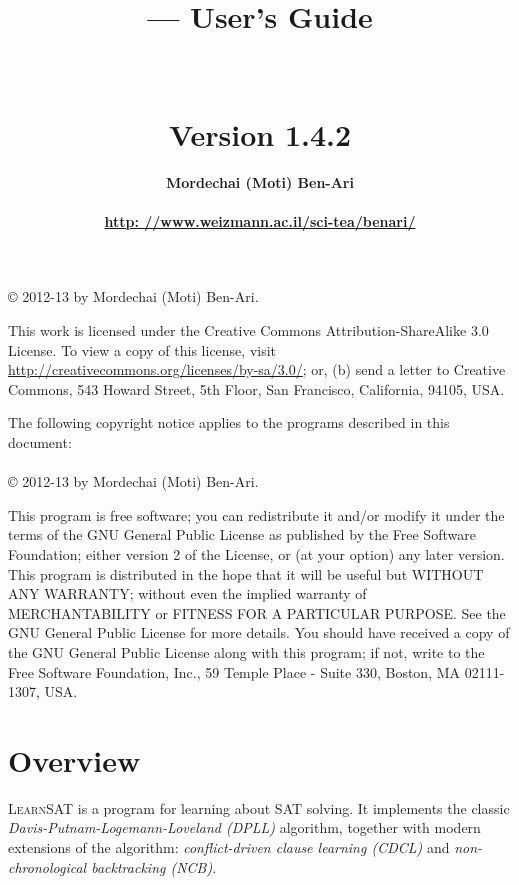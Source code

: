 \documentclass[11pt]{article}
\title{\bfseries \ls{} --- User's Guide\\\mbox{}\\\mbox{}\\
\bfseries\normalsize Version 1.4.2}
\author{\bfseries Mordechai (Moti) Ben-Ari\\\mbox{}\\
\url{http: //www.weizmann.ac.il/sci-tea/benari/}}
\newcommand*{\ls}{\textsc{LearnSAT}}
\begin{document}
\maketitle

\thispagestyle{empty}

\vspace*{\fill}

\begin{center}
\copyright{} 2012-13 by Mordechai (Moti) Ben-Ari.
\end{center}
This work is licensed under the Creative Commons Attribution-ShareAlike 3.0
License. To view a copy of this license, visit
\url{http://creativecommons.org/licenses/by-sa/3.0/}; or, (b) send a letter
to Creative Commons, 543 Howard Street, 5th Floor, San Francisco,
California, 94105, USA.

\bigskip\bigskip

 
\begin{center}
The following copyright notice applies to the programs described in this
document:\mbox{}\\\mbox{}\\
\copyright{} 2012-13 by Mordechai (Moti) Ben-Ari.
\end{center}

This program is free software; you can redistribute it and/or
modify it under the terms of the GNU General Public License
as published by the Free Software Foundation; either version 2
of the License, or (at your option) any later version.
This program is distributed in the hope that it will be useful
but WITHOUT ANY WARRANTY; without even the implied warranty of
MERCHANTABILITY or FITNESS FOR A PARTICULAR PURPOSE.
See the GNU General Public License for more details.
You should have received a copy of the GNU General Public License
along with this program; if not, write to the Free Software
Foundation, Inc., 59 Temple Place - Suite 330, Boston, MA
02111-1307, USA.

\setcounter{page}{0}
\newpage

\section{Overview}

\ls{} is a program for learning about SAT solving. It implements the
classic \emph{Davis-Putnam-Logemann-Loveland (DPLL)} algorithm, together
with modern extensions of the algorithm: \emph{conflict-driven clause
learning (CDCL)} and \emph{non-chronological backtracking (NCB)}.
\end{document}
